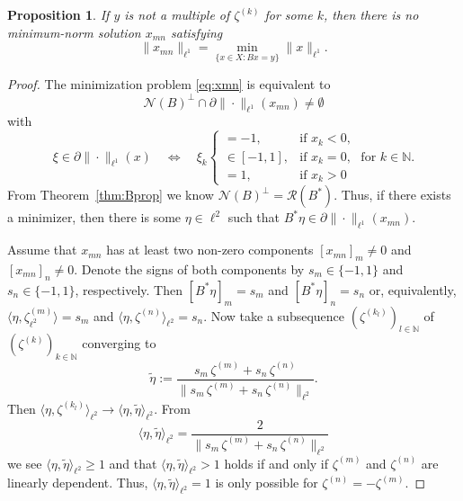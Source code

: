 \documentclass[10pt,a4paper]{amsart}
\newtheorem{proposition}{Proposition}
\begin{document}
\begin{proposition}
If $y$ is not a multiple of $\zeta^{(k)}$ for some $k$, then there is no minimum-norm solution $x_{mn}$ satisfying
\begin{equation}\label{eq:xmn}
\|x_{mn}\|_{\ell^1} = \min_{\{x\in X:Bx=y\}}\|x\|_{\ell^1}.
\end{equation}
\end{proposition}

\begin{proof}
The minimization problem \eqref{eq:xmn} is equivalent to
\begin{equation*}
\mathcal{N}(B)^\perp\cap\partial\|\cdot\|_{\ell^1}(x_{mn})\neq\emptyset
\end{equation*}
with
\begin{equation*}
\xi\in\partial\|\cdot\|_{\ell^1}(x)\quad\Leftrightarrow\quad\xi_k\begin{cases}
=-1,&\text{if }x_k<0,\\
\in[-1,1],&\text{if }x_k=0,\\
=1,&\text{if }x_k>0
\end{cases}
\;\text{for }k\in\mathbb{N}.
\end{equation*}
From Theorem~\ref{thm:Bprop} we know $\mathcal{N}(B)^\perp=\mathcal{R}(B^\ast)$. Thus, if there exists a minimizer, then there is some $\eta\in\ell^2$ such that $B^\ast\eta\in\partial\|\cdot\|_{\ell^1}(x_{mn})$.
\par
Assume that $x_{mn}$ has at least two non-zero components $[x_{mn}]_m\neq 0$ and $[x_{mn}]_n\neq 0$. Denote the signs of both components by $s_m\in\{-1,1\}$ and $s_n\in\{-1,1\}$, respectively. Then $[B^\ast\eta]_m=s_m$ and $[B^\ast\eta]_n=s_n$ or, equivalently, $\langle\eta,\zeta^{(m)}_{\ell^2}\rangle=s_m$ and $\langle\eta,\zeta^{(n)}\rangle_{\ell^2}=s_n$. Now take a subsequence $(\zeta^{(k_l)})_{l\in\mathbb{N}}$ of $(\zeta^{(k)})_{k\in\mathbb{N}}$ converging to
\begin{equation}
\tilde{\eta}:=\frac{s_m\,\zeta^{(m)}+s_n\,\zeta^{(n)}}{\|s_m\,\zeta^{(m)}+s_n\,\zeta^{(n)}\|_{\ell^2}}.
\end{equation}
Then $\langle\eta,\zeta^{(k_l)}\rangle_{\ell^2}\to\langle\eta,\tilde{\eta}\rangle_{\ell^2}$. From
\begin{equation}
\langle\eta,\tilde{\eta}\rangle_{\ell^2}=\frac{2}{\|s_m\,\zeta^{(m)}+s_n\,\zeta^{(n)}\|_{\ell^2}}
\end{equation}
we see $\langle\eta,\tilde{\eta}\rangle_{\ell^2}\geq 1$ and that $\langle\eta,\tilde{\eta}\rangle_{\ell^2}>1$ holds if and only if $\zeta^{(m)}$ and $\zeta^{(n)}$ are linearly dependent. Thus, $\langle\eta,\tilde{\eta}\rangle_{\ell^2}=1$ is only possible for $\zeta^{(n)}=-\zeta^{(m)}$.

\end{proof}
\end{document}
